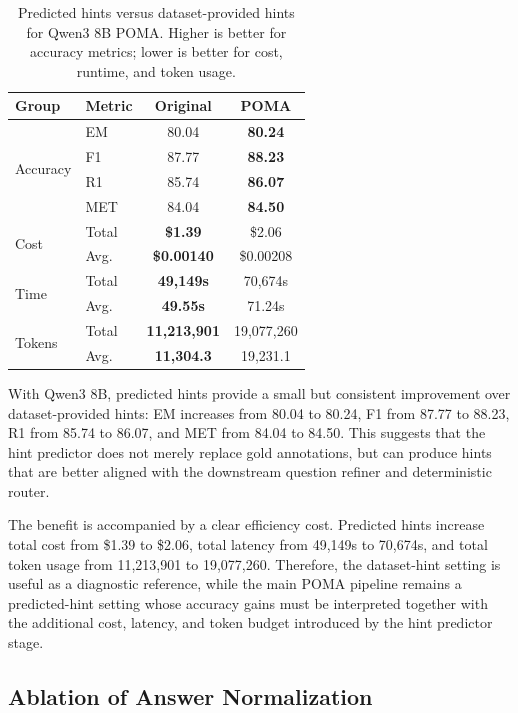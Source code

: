 \documentclass[]{interact}
\begin{document}
\begin{table}[!t]
\centering
\small
\setlength{\tabcolsep}{7pt}
\caption{Predicted hints versus dataset-provided hints for Qwen3 8B POMA. Higher is better for accuracy metrics; lower is better for cost, runtime, and token usage.}
\label{tab:predicted-dataset-hints}
\begin{tabular}{llcc}
\toprule
{\textbf{Group}}
& {\textbf{Metric}}
& \textbf{Original} & \textbf{POMA} \\
\midrule
\multirow{4}{*}{Accuracy}
& EM & 80.04 & \textbf{80.24} \\
& F1 & 87.77 & \textbf{88.23} \\
& R1 & 85.74 & \textbf{86.07} \\
& MET & 84.04 & \textbf{84.50} \\
\midrule
\multirow{2}{*}{Cost}
& Total & \textbf{\$1.39} & \$2.06 \\
& Avg. & \textbf{\$0.00140} & \$0.00208 \\
\midrule
\multirow{2}{*}{Time}
& Total & \textbf{49,149s} & 70,674s \\
& Avg. & \textbf{49.55s} & 71.24s \\
\midrule
\multirow{2}{*}{Tokens}
& Total & \textbf{11,213,901} & 19,077,260 \\
& Avg. & \textbf{11,304.3} & 19,231.1 \\
\bottomrule
\end{tabular}
\end{table}

With Qwen3 8B, predicted hints provide a small but consistent improvement over dataset-provided hints: EM increases from 80.04 to 80.24, F1 from 87.77 to 88.23, R1 from 85.74 to 86.07, and MET from 84.04 to 84.50. This suggests that the hint predictor does not merely replace gold annotations, but can produce hints that are better aligned with the downstream question refiner and deterministic router.

The benefit is accompanied by a clear efficiency cost. Predicted hints increase total cost from \$1.39 to \$2.06, total latency from 49,149s to 70,674s, and total token usage from 11,213,901 to 19,077,260. Therefore, the dataset-hint setting is useful as a diagnostic reference, while the main POMA pipeline remains a predicted-hint setting whose accuracy gains must be interpreted together with the additional cost, latency, and token budget introduced by the hint predictor stage.

\subsection{Ablation of Answer Normalization}
\end{document}
